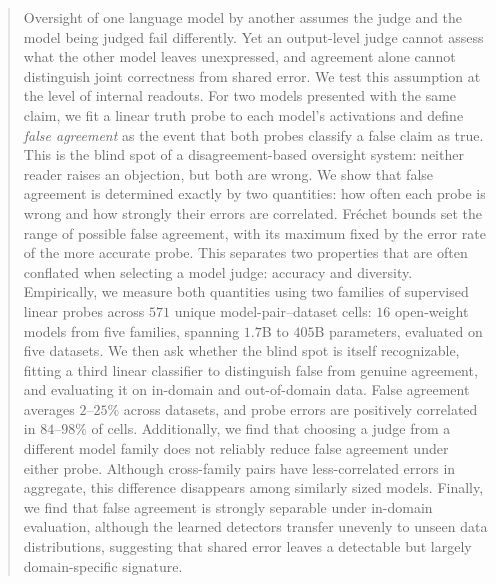 \begin{abstract}
Oversight of one language model by another assumes the judge and the model being
judged fail differently. Yet an output-level judge cannot assess what the other
model leaves unexpressed, and agreement alone cannot distinguish joint
correctness from shared error. We test this assumption at the level of internal
readouts.
%
For two models presented with the same claim, we fit a linear truth probe to
each model's activations and define \emph{false agreement} as the event
that both probes classify a false claim as true. This is the blind spot of a
disagreement-based oversight system: neither reader raises an objection, but
both are wrong. We show that false agreement is determined exactly by two
quantities: how often each probe is wrong and how strongly their errors are
correlated. Fr\'echet bounds set the range of possible false agreement, with its
maximum fixed by the error rate of the more accurate probe. This separates two
properties that are often conflated when selecting a model judge: accuracy and
diversity.
%
Empirically, we measure both quantities using two families of supervised linear
probes across $571$ unique model-pair--dataset cells: $16$ open-weight models
from five families, spanning $1.7$B to $405$B parameters, evaluated on five
datasets. We then ask whether the blind spot is itself recognizable,
fitting a third linear classifier to distinguish false from genuine agreement,
and evaluating it on in-domain and out-of-domain data.
%
False agreement averages $2$--$25\%$ across datasets, and probe errors are
positively correlated in $84$--$98\%$ of cells. Additionally, we find that
choosing a judge from a different model family does not reliably reduce false
agreement under either probe. Although cross-family pairs have less-correlated errors in
aggregate, this difference disappears among similarly sized models. Finally,
we find that false agreement is strongly separable under in-domain evaluation, although the
learned detectors transfer unevenly to unseen data distributions, suggesting
that shared error leaves a detectable but largely domain-specific signature.
\end{abstract}

